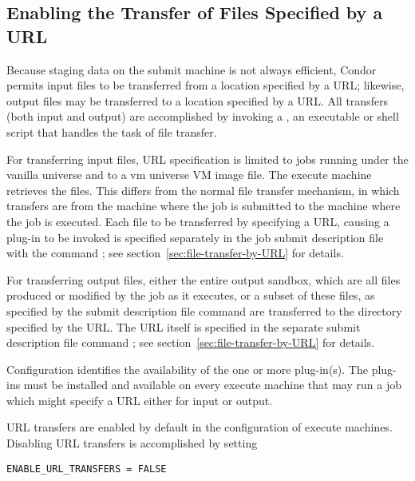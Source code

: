 \subsection{\label{sec:URL-transfer}
Enabling the Transfer of Files Specified by a URL}

\Revision

Because staging data on the submit machine is not always efficient,
Condor permits input files to be transferred
from a location specified by a URL;
likewise, output files may be transferred
to a location specified by a URL.
All transfers (both input and output) are accomplished by invoking 
a ,
an executable or shell script that handles the task of file transfer.

For transferring input files,
URL specification is limited to jobs running under the vanilla universe 
and to a vm universe VM image file.
The execute machine retrieves the files.
This differs from the normal file transfer mechanism,
in which transfers are from the machine where the job is submitted
to the machine where the job is executed.
Each file to be transferred by specifying a URL, causing a
plug-in to be invoked is specified separately in the job submit
description file with the command ;
see section~\ref{sec:file-transfer-by-URL} for details.

For transferring output files,
either the entire output sandbox, which are all files produced or
modified by the job as it executes, or a subset of these files,
as specified by the submit description file command 
 are transferred to the
directory specified by the URL.
The URL itself is specified in the separate submit description file command 
;
see section~\ref{sec:file-transfer-by-URL} for details.

Configuration identifies the availability of the one or more plug-in(s).
The plug-ins must be installed and available on every execute machine 
that may run a job which might specify a URL either for input or output.

URL transfers are enabled by default in the configuration 
of execute machines.
Disabling URL transfers is accomplished by setting
\footnotesize
\begin{verbatim}
ENABLE_URL_TRANSFERS = FALSE
\end{verbatim}
\normalsize

